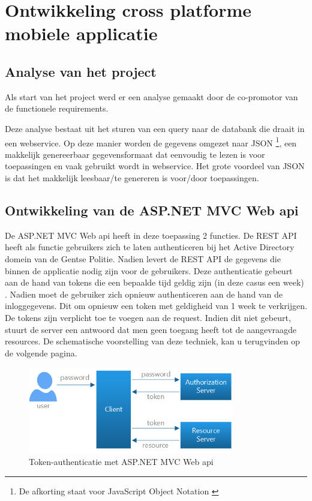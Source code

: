 \chapter{Ontwikkeling cross platforme mobiele applicatie}
\label{ch:ontwikkelingcrossplatformapp}
\section{Analyse van het project}
Als start van het project werd er een analyse gemaakt door de co-promotor van de functionele requirements.

Deze analyse bestaat uit het sturen van een query naar de databank die draait in een webservice.
Op deze manier worden de gegevens omgezet naar JSON \footnote{De afkorting staat voor
JavaScript Object Notation \cite{inleidingtotjson2017}}, een makkelijk genereerbaar gegevensformaat dat eenvoudig te lezen is voor toepassingen en vaak gebruikt wordt in webservice.  Het grote voordeel van JSON
is dat het makkelijk leesbaar/te genereren is voor/door toepassingen.

\section{Ontwikkeling van de ASP.NET MVC Web api}
De ASP.NET MVC Web api heeft in deze toepassing 2 functies. De REST API heeft als functie gebruikers zich te laten
authenticeren bij het Active Directory domein van de Gentse Politie. Nadien levert de REST API de gegevens die binnen
de applicatie nodig zijn voor de gebruikers. Deze authenticatie gebeurt aan de hand van tokens die een bepaalde tijd geldig zijn (in deze casus een week) \citep{authenticatemvcapplication2017}. Nadien moet de gebruiker zich opnieuw authenticeren aan de hand van de inloggegevens. Dit om opnieuw een
token met geldigheid van 1 week te verkrijgen. De tokens zijn verplicht toe te voegen aan de request. Indien dit niet gebeurt, stuurt
de server een antwoord dat men geen toegang heeft tot de aangevraagde resources. De schematische voorstelling van deze techniek,
kan u terugvinden op de volgende pagina.

\begin{figure}[ht!]
\centering
\caption{Token-authenticatie met ASP.NET MVC Web api}
\includegraphics[width=90mm]{./img/authentication.png}
\end{figure}

